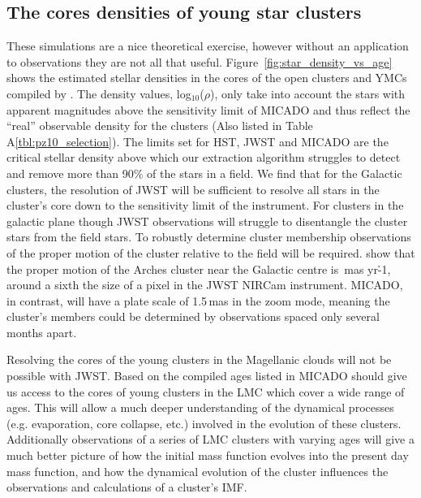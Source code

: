 \subsection{The cores densities of young star clusters}

These simulations are a nice theoretical exercise, however without an application to observations they are not all that useful. Figure~\ref{fig:star_density_vs_age} shows the estimated stellar densities in the cores of the open clusters and YMCs compiled by \citet{portegies2010}. The  density values, log$_{10}$($\rho$), only take into account the stars with apparent magnitudes above the sensitivity limit of MICADO and thus reflect the ``real'' observable density for the clusters (Also listed in Table A\ref{tbl:pz10_selection}). The limits set for HST, JWST and MICADO are the critical stellar density above which our extraction algorithm struggles to detect and remove more than 90\% of the stars in a field. We find that for the Galactic clusters, the resolution of JWST will be sufficient to resolve all stars in the cluster's core down to the sensitivity limit of the instrument. For clusters in the galactic plane though JWST observations will struggle to disentangle the cluster stars from the field stars. To robustly determine cluster membership observations of the proper motion of the cluster relative to the field will be required. \citet{stolte2008} show that the proper motion of the Arches cluster near the Galactic centre is \,mas yr\h{-1}, around a sixth the size of a pixel in the JWST NIRCam instrument. MICADO, in contrast, will have a plate scale of 1.5\,mas in the zoom mode, meaning the cluster's members could be determined by observations spaced only several months apart.

Resolving the cores of the young clusters in the Magellanic clouds will not be possible with JWST. Based on the compiled ages listed in \citet{portegies2010} MICADO should give us access to the cores of young clusters in the LMC which cover a wide range of ages. This will allow a much deeper understanding of the dynamical processes (e.g. evaporation, core collapse, etc.) involved in the evolution of these clusters. Additionally observations of a series of LMC clusters with varying ages will give a much better picture of how the initial mass function evolves into the present day mass function, and how the dynamical evolution of the cluster influences the observations and calculations of a cluster's IMF.



